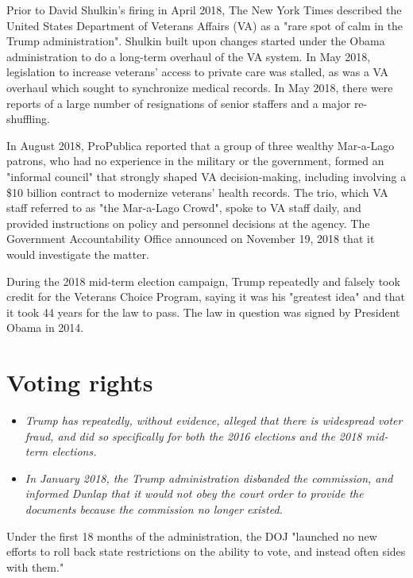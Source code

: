 Prior to David Shulkin's firing in April 2018, The New York Times
described the United States Department of Veterans Affairs (VA) as a
"rare spot of calm in the Trump administration". Shulkin built upon
changes started under the Obama administration to do a long-term
overhaul of the VA system. In May 2018, legislation to increase
veterans' access to private care was stalled, as was a VA overhaul which
sought to synchronize medical records. In May 2018, there were reports
of a large number of resignations of senior staffers and a major
re-shuffling.

In August 2018, ProPublica reported that a group of three wealthy
Mar-a-Lago patrons, who had no experience in the military or the
government, formed an "informal council" that strongly shaped VA
decision-making, including involving a \$10 billion contract to
modernize veterans' health records. The trio, which VA staff referred to
as "the Mar-a-Lago Crowd", spoke to VA staff daily, and provided
instructions on policy and personnel decisions at the agency. The
Government Accountability Office announced on November 19, 2018 that it
would investigate the matter.

During the 2018 mid-term election campaign, Trump repeatedly and falsely
took credit for the Veterans Choice Program, saying it was his "greatest
idea" and that it took 44 years for the law to pass. The law in question
was signed by President Obama in 2014.

\section{Voting rights}\label{voting-rights}

\begin{itemize}
\item
  \emph{Trump has repeatedly, without evidence, alleged that there is
  widespread voter fraud, and did so specifically for both the 2016
  elections and the 2018 mid-term elections.}
\item
  \emph{In January 2018, the Trump administration disbanded the
  commission, and informed Dunlap that it would not obey the court order
  to provide the documents because the commission no longer existed.}
\end{itemize}

Under the first 18 months of the administration, the DOJ "launched no
new efforts to roll back state restrictions on the ability to vote, and
instead often sides with them."


